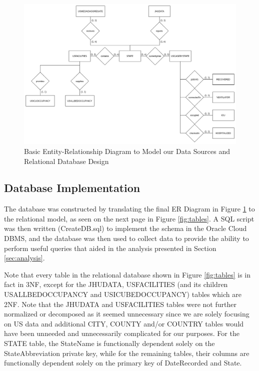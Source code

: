 \documentclass[11pt]{article}
\begin{document}
\FloatBarrier
\begin{figure}[h]
    \centering
    \includegraphics[width=\textwidth]{diagrams/ER1.png}
    \caption{Basic Entity-Relationship Diagram to Model our Data Sources and Relational Database Design}
    \label{fig:er1}
\end{figure}
\FloatBarrier

\pagebreak

\subsection{Database Implementation}
\label{subsec:implementation}

\noindent
The database was constructed by translating the final ER Diagram in Figure \ref{fig:er1} to the relational model, as seen on the next page in Figure \ref{fig:tables}. A SQL script was then written (CreateDB.sql) to implement the schema in the Oracle Cloud DBMS, and the database was then used to collect data to provide the ability to perform useful queries that aided in the analysis presented in Section \ref{sec:analysis}.

\noindent
Note that every table in the relational database shown in Figure \ref{fig:tables} is in fact in 3NF, except for the JHUDATA, USFACILITIES (and its children USALLBEDOCCUPANCY and USICUBEDOCCUPANCY) tables which are 2NF. Note that the JHUDATA  and USFACILITIES tables were not further normalized or decomposed as it seemed unnecessary since we are solely focusing on US data and additional CITY, COUNTY and/or COUNTRY tables would have been unneeded and unnecessarily complicated for our purposes. For the STATE table, the StateName is functionally dependent solely on the StateAbbreviation private key, while for the remaining tables, their columns are functionally dependent solely on the primary key of DateRecorded and State.
\end{document}
